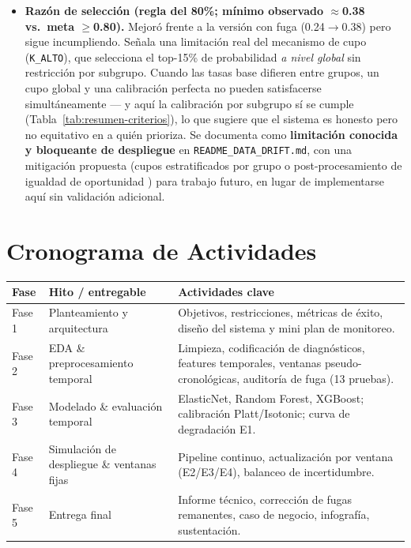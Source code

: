 \documentclass[11pt,a4paper]{article}
\begin{document}
\begin{itemize}[leftmargin=*]
\item \textbf{Razón de selección (regla del 80\%; mínimo observado $\approx$0.38 vs.\ meta $\geq$0.80).} Mejoró frente a la versión con fuga (0.24$\to$0.38) pero sigue incumpliendo. Señala una limitación real del mecanismo de cupo (\texttt{K\_ALTO}), que selecciona el top-15\% de probabilidad \emph{a nivel global} sin restricción por subgrupo. Cuando las tasas base difieren entre grupos, un cupo global y una calibración perfecta no pueden satisfacerse simultáneamente \cite{chouldechova2017} --- y aquí la calibración por subgrupo sí se cumple (Tabla~\ref{tab:resumen-criterios}), lo que sugiere que el sistema es honesto pero no equitativo en a quién prioriza. Se documenta como \textbf{limitación conocida y bloqueante de despliegue} en \texttt{README\_DATA\_DRIFT.md}, con una mitigación propuesta (cupos estratificados por grupo o post-procesamiento de igualdad de oportunidad \cite{hardt2016}) para trabajo futuro, en lugar de implementarse aquí sin validación adicional.
\end{itemize}

\section{Cronograma de Actividades}

\begin{longtable}{p{2.2cm}p{3.6cm}p{8cm}}
\toprule
\textbf{Fase} & \textbf{Hito / entregable} & \textbf{Actividades clave} \\
\midrule
\endhead
Fase 1 & Planteamiento y arquitectura & Objetivos, restricciones, métricas de éxito, diseño del sistema y mini plan de monitoreo. \\
Fase 2 & EDA \& preprocesamiento temporal & Limpieza, codificación de diagnósticos, features temporales, ventanas pseudo-cronológicas, auditoría de fuga (13 pruebas). \\
Fase 3 & Modelado \& evaluación temporal & ElasticNet, Random Forest, XGBoost; calibración Platt/Isotonic; curva de degradación E1. \\
Fase 4 & Simulación de despliegue \& ventanas fijas & Pipeline continuo, actualización por ventana (E2/E3/E4), balanceo de incertidumbre. \\
Fase 5 & Entrega final & Informe técnico, corrección de fugas remanentes, caso de negocio, infografía, sustentación. \\
\bottomrule
\end{longtable}
\end{document}
